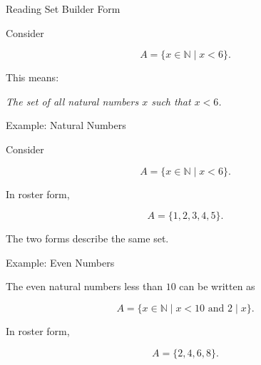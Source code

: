 \documentclass[aspectratio=169,11pt]{beamer}
\begin{document}

\begin{frame}{Reading Set Builder Form}

Consider

\[
A=\{x\in\mathbb N\mid x<6\}.
\]

\vspace{0.4cm}

This means:

\begin{center}

\textit{The set of all natural numbers $x$ such that $x<6$.}

\end{center}

\vspace{0.4cm}


\end{frame}


\begin{frame}{Example: Natural Numbers}

Consider

\[
A=\{x\in\mathbb N\mid x<6\}.
\]

\vspace{0.35cm}

In roster form,

\[
\boxed{
A=\{1,2,3,4,5\}.
}
\]

\vspace{0.35cm}

The two forms describe the same set.

\end{frame}


\begin{frame}{Example: Even Numbers}

The even natural numbers less than $10$ can be written as

\[
\boxed{
A=
\{x\in\mathbb N
\mid
x<10
\text{ and }
2\mid x
\}.
}
\]

\vspace{0.4cm}

In roster form,

\[
A=\{2,4,6,8\}.
\]

\end{frame}

\end{document}
